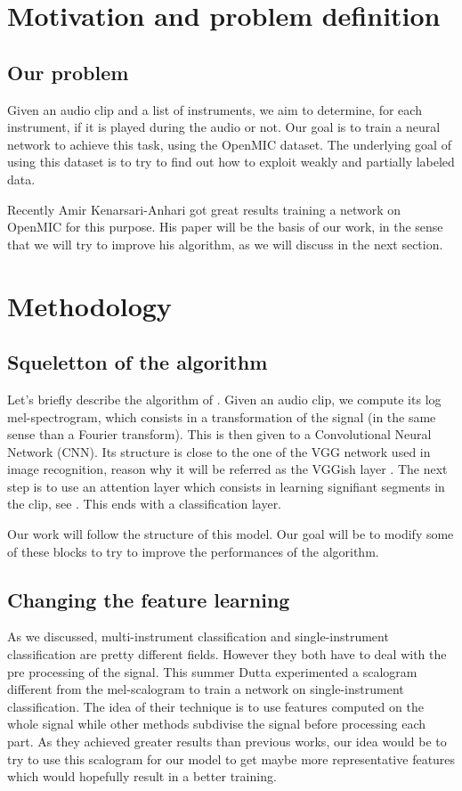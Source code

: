 \documentclass[final]{cvpr}
\begin{document}
\section{Motivation and problem definition}
\subsection{Our problem}

Given an audio clip and a list of instruments, we aim to determine, for each instrument, if it is played during the audio or not. Our goal is to train a neural network to achieve this task, using the OpenMIC dataset. The underlying goal of using this dataset is to try to find out how to exploit weakly and partially labeled data. 

Recently Amir Kenarsari-Anhari \cite{squelette_progr} got great results training a network on OpenMIC for this purpose. His paper will be the basis of our work, in the sense that we will try to improve his algorithm, as we will discuss in the next section.
\section{Methodology}
\subsection{Squeletton of the algorithm}
Let's briefly describe the algorithm of \cite{squelette_progr}. Given an audio clip, we compute its log mel-spectrogram, which consists in a transformation of the signal (in the same sense than a Fourier transform). This is then given to a Convolutional Neural Network (CNN). Its structure is close to the one of the VGG network used in image recognition, reason why it will be referred as the VGGish layer \cite{VGGish_net}. The next step is to use an attention layer which consists in learning signifiant segments in the clip, see \cite{attention}. This ends with a classification layer.

Our work will follow the structure of this model. Our goal will be to modify some of these blocks to try to improve the performances of the algorithm.
\subsection{Changing the feature learning}
As we discussed, multi-instrument classification and single-instrument classification are pretty different fields. However they both have to deal with the pre processing of the signal. This summer Dutta \etal \cite{features_descr} experimented a scalogram different from the mel-scalogram to train a network on single-instrument classification. The idea of their technique is to use features computed on the whole signal while other methods subdivise the signal before processing each part. As they achieved greater results than previous works, our idea would be to try to use this scalogram for our model to get maybe more representative features which would hopefully result in a better training. 
\end{document}
